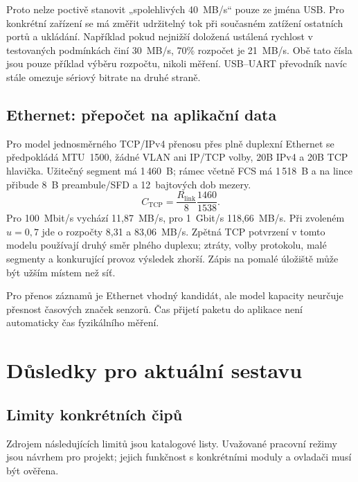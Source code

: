 \documentclass[11pt,a4paper]{article}
\begin{document}
Proto nelze poctivě stanovit „spolehlivých 40~MB/s“ pouze ze jména USB. Pro konkrétní zařízení se má změřit udržitelný tok při současném zatížení ostatních portů a ukládání. Například pokud nejnižší doložená ustálená rychlost v testovaných podmínkách činí 30~MB/s, 70\% rozpočet je 21~MB/s. Obě tato čísla jsou pouze příklad výběru rozpočtu, nikoli měření. USB--UART převodník navíc stále omezuje sériový bitrate na druhé straně.

\subsection{Ethernet: přepočet na aplikační data}
Pro model jednosměrného TCP/IPv4 přenosu přes plně duplexní Ethernet se předpokládá MTU~1500, žádné VLAN ani IP/TCP volby, 20B IPv4 a 20B TCP hlavička. Užitečný segment má 1\,460~B; rámec včetně FCS má 1\,518~B a na lince přibude 8~B preambule/SFD a 12~bajtových dob mezery.\cite{ethernet,ipv4,tcp}
\begin{equation}
C_{\mathrm{TCP}}=\frac{R_{\mathrm{link}}}{8}\frac{1460}{1538}.
\end{equation}
Pro 100~Mbit/s vychází 11,87~MB/s, pro 1~Gbit/s 118,66~MB/s. Při zvoleném $u=0{,}7$ jde o rozpočty 8,31 a 83,06~MB/s. Zpětná TCP potvrzení v tomto modelu používají druhý směr plného duplexu; ztráty, volby protokolu, malé segmenty a konkurující provoz výsledek zhorší. Zápis na pomalé úložiště může být užším místem než síť.

Pro přenos záznamů je Ethernet vhodný kandidát, ale model kapacity neurčuje přesnost časových značek senzorů. Čas přijetí paketu do aplikace není automaticky čas fyzikálního měření.

\section{Důsledky pro aktuální sestavu}
\subsection{Limity konkrétních čipů}
Zdrojem následujících limitů jsou katalogové listy. Uvažované pracovní režimy jsou návrhem pro projekt; jejich funkčnost s konkrétními moduly a ovladači musí být ověřena.
\end{document}
